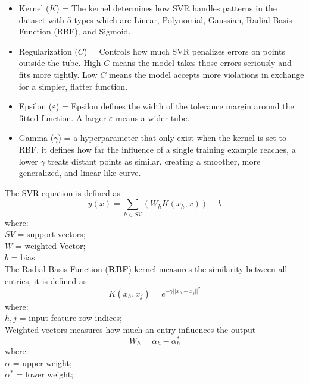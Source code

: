 \begin{itemize}
	\item[] Kernel (\underline{$K$}) = The kernel determines how SVR handles patterns in the dataset with 5 types which are Linear, Polynomial, Gaussian, Radial Basis Function (RBF), and Sigmoid.
	\item[] Regularization ($C$) = Controls how much SVR penalizes errors on points outside the tube. High $C$ means the model takes those errors seriously and fits more tightly. Low $C$ means the model accepts more violations in exchange for a simpler, flatter function.
	\item[] Epsilon ($\varepsilon$) = Epsilon defines the width of the tolerance margin around the fitted function. A larger $\varepsilon$ means a wider tube.
	\item[] Gamma ($\gamma$) = a hyperparameter that only exist when the kernel is set to RBF. it defines how far the influence of a single training example reaches, a lower $\gamma$ treats distant points as similar, creating a smoother, more generalized, and linear-like curve.
\end{itemize}

The SVR equation is defined as
\begin{equation}
	y(x) = \sum_{h \in SV} (W_h K(x_h, x)) + b
	\label{eq:svr_equation}
\end{equation}
\noindent where: \\[2pt]
$SV$ = support vectors; \\
$W$ = weighted Vector; \\
$b$ = bias. \\[12pt]

The Radial Basis Function (\textbf{RBF}) kernel measures the similarity between all entries, it is defined as
\begin{equation}
	K(x_h, x_j) = e^{-\gamma ||x_h - x_j||^2}
	\label{eq:rbf_kernel}
\end{equation}
\noindent where: \\[2pt]
$h, j$ = input feature row indices; \\[12pt]

Weighted vectors measures how much an entry influences the output
\begin{equation}
	W_h = \alpha_h - \alpha_h^*
	\label{eq:weighted_vectors}
\end{equation}
\noindent where: \\[2pt]
$\alpha$ = upper weight; \\
$\alpha^*$ = lower weight; \\[12pt]

